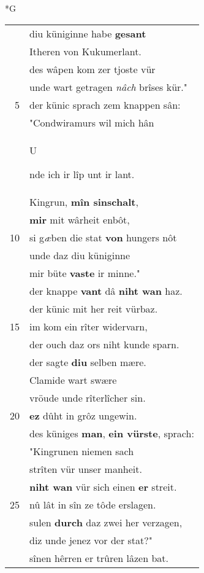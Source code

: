\documentclass[8pt,a4paper,notitlepage]{article}
\begin{document}
\begin{table}[ht]
\begin{minipage}[t]{0.5\linewidth}
\small
\begin{center}*G
\end{center}
\begin{tabular}{rl}
 & diu küniginne habe \textbf{gesant}\\ 
 & Itheren von Kukumerlant.\\ 
 & des wâpen kom zer tjoste vür\\ 
 & unde wart getragen \textit{nâch} brîses kür."\\ 
5 & der künic sprach zem knappen sân:\\ 
 & "Condwiramurs wil mich hân\\ 
 & \begin{large}U\end{large}nde ich ir lîp unt ir lant.\\ 
 & Kingrun, \textbf{mîn sinschalt},\\ 
 & \textbf{mir} mit wârheit enbôt,\\ 
10 & si g\textit{æ}ben die stat \textbf{von} hungers nôt\\ 
 & unde daz diu küniginne\\ 
 & mir büte \textbf{vaste} ir minne."\\ 
 & der knappe \textbf{vant} dâ \textbf{niht wan} haz.\\ 
 & der künic mit her reit vürbaz.\\ 
15 & im kom ein rîter widervarn,\\ 
 & der ouch daz ors niht kunde sparn.\\ 
 & der sagte \textbf{diu} selben mære.\\ 
 & Clamide wart swære\\ 
 & vröude unde rîterlîcher sin.\\ 
20 & \textbf{ez} dûht in grôz ungewin.\\ 
 & des küniges \textbf{man}, \textbf{ein vürste}, sprach:\\ 
 & "Kingrunen niemen sach\\ 
 & strîten vür unser manheit.\\ 
 & \textbf{niht wan} vür sich einen \textbf{er} streit.\\ 
25 & nû lât in sîn ze tôde erslagen.\\ 
 & sulen \textbf{durch} daz zwei her verzagen,\\ 
 & diz unde jenez vor der stat?"\\ 
 & sînen hêrren er trûren lâzen bat.\\ 

\end{tabular}
\end{minipage}
\end{table}
\end{document}
